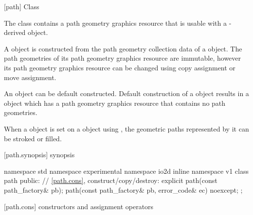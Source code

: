  [path] {Class }

\pnum
{}
The class  contains a path geometry graphics resource that is usable with a -derived object.

\pnum
A  object is constructed from the path geometry collection data of a  object. The path geometries of its path geometry graphics resource are immutable, however its path geometry graphics resource can be changed using copy assignment or move assignment.

\pnum
An  object can be default constructed. Default construction of a  object results in a  object which has a path geometry graphics resource that contains no path geometries.

\pnum
When a  object is set on a  object using 
, the geometric paths represented by it can be 
stroked or filled.

%
 [path.synopsis] { synopsis}

\begin{codeblock}
namespace std { namespace experimental { namespace io2d { inline namespace v1 {
  class path {
    public:
    // \ref{path.cons}, construct/copy/destroy:
    explicit path(const path_factory& pb);
    path(const path_factory& pb, error_code& ec) noexcept;
  };
} } } }
\end{codeblock}

 [path.cons] { constructors and assignment operators}

